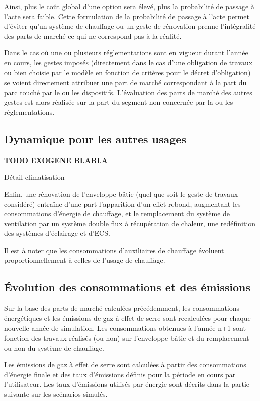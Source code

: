 \documentclass[10.5pt,a4paper]{article}
\begin{document}
{Ainsi, plus le coût global d’une option sera élevé, plus la probabilité de passage à l’acte sera faible. Cette formulation de la probabilité de passage à l’acte permet d’éviter qu'un système de chauffage ou un geste de rénovation prenne l'intégralité des parts de marché ce qui ne correspond pas à la réalité. 

Dans le cas où une ou plusieurs réglementations sont en vigueur durant l’année en cours, les gestes imposés (directement dans le cas d’une obligation de travaux ou bien choisie par le modèle en fonction de critères pour le décret d'obligation) se voient directement attribuer une part de marché correspondant à la part du parc touché par le ou les dispositifs. L’évaluation des parts de marché des autres gestes est alors réalisée sur la part du segment non concernée par la ou les réglementations.

\subsection{Dynamique pour les autres usages}

\textbf{TODO EXOGENE BLABLA}

Détail climatisation

Enfin, une rénovation de l’enveloppe bâtie (quel que soit le geste de travaux considéré) entraîne d’une part l’apparition d’un effet rebond, augmentant les consommations d’énergie de chauffage, et le remplacement du système de ventilation par un système double flux à récupération de chaleur, une redéfinition des systèmes d’éclairage et d’ECS. 

Il est à noter que les consommations d’auxiliaires de chauffage évoluent proportionnellement à celles de l’usage de chauffage. 


\subsection{Évolution des consommations et des émissions}

Sur la base des parts de marché calculées précédemment, les consommations énergétiques et les émissions de gaz à effet de serre sont recalculées pour chaque nouvelle année de simulation. Les consommations obtenues à l’année n+1 sont fonction des travaux réalisés (ou non) sur l’enveloppe bâtie et du remplacement ou non du système de chauffage. 

Les émissions de gaz à effet de serre sont calculées à partir des consommations d’énergie finale et des taux d’émissions définis pour la période en cours par l’utilisateur. Les taux d'émissions utilisés par énergie sont décrits dans la partie suivante sur les scénarios simulés. 


}
\end{document}
